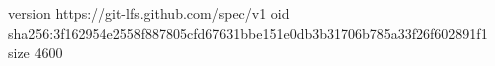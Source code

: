version https://git-lfs.github.com/spec/v1
oid sha256:3f162954e2558f887805cfd67631bbe151e0db3b31706b785a33f26f602891f1
size 4600
